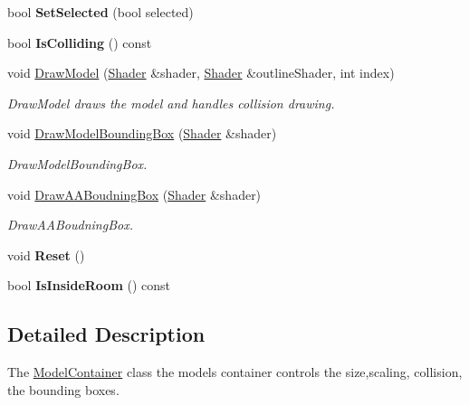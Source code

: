 \begin{DoxyCompactItemize}
\item 
\hypertarget{class_model_container_a56c9edb4f2eb179a213e639dbaa05c9e}{}bool {\bfseries Set\+Selected} (bool selected)\label{class_model_container_a56c9edb4f2eb179a213e639dbaa05c9e}

\item 
\hypertarget{class_model_container_ad772dd3ae73fa1f3237c83e97a5fc80b}{}bool {\bfseries Is\+Colliding} () const \label{class_model_container_ad772dd3ae73fa1f3237c83e97a5fc80b}

\item 
void \hyperlink{class_model_container_a9d6352f35e74be676bf923d38ec0b24c}{Draw\+Model} (\hyperlink{class_shader}{Shader} \&shader, \hyperlink{class_shader}{Shader} \&outline\+Shader, int index)
\begin{DoxyCompactList}\small\item\em Draw\+Model draws the model and handles collision drawing. \end{DoxyCompactList}\item 
void \hyperlink{class_model_container_a4f73480431ca9bca8cbcdac87ef1d055}{Draw\+Model\+Bounding\+Box} (\hyperlink{class_shader}{Shader} \&shader)
\begin{DoxyCompactList}\small\item\em Draw\+Model\+Bounding\+Box. \end{DoxyCompactList}\item 
void \hyperlink{class_model_container_a6048f0f26f86025c6854bf42d7c5cc19}{Draw\+A\+A\+Boudning\+Box} (\hyperlink{class_shader}{Shader} \&shader)
\begin{DoxyCompactList}\small\item\em Draw\+A\+A\+Boudning\+Box. \end{DoxyCompactList}\item 
\hypertarget{class_model_container_aff6393883a26f3d71476e24e34f58852}{}void {\bfseries Reset} ()\label{class_model_container_aff6393883a26f3d71476e24e34f58852}

\item 
\hypertarget{class_model_container_a84dee4d7878153ecd2971427b2dd4c87}{}bool {\bfseries Is\+Inside\+Room} () const \label{class_model_container_a84dee4d7878153ecd2971427b2dd4c87}

\end{DoxyCompactItemize}


\subsection{Detailed Description}
The \hyperlink{class_model_container}{Model\+Container} class the model\textquotesingle{}s container controls the size,scaling, collision, the bounding boxes. 

